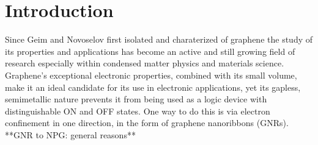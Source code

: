 
\chapter{Introduction}

\label{ch1}


\newcommand{\keyword}[1]{\textbf{#1}}
\newcommand{\tabhead}[1]{\textbf{#1}}
\newcommand{\code}[1]{\texttt{#1}}
\newcommand{\file}[1]{\texttt{\bfseries#1}}
\newcommand{\option}[1]{\texttt{\itshape#1}}


Since Geim and Novoselov first isolated and charaterized of graphene\parencite{Geim2007} the study of its properties and applications has become an active and still growing field of research especially within condensed matter physics and materials science\parencite{Houtsma2021}. Graphene’s exceptional electronic properties, combined with its small volume, make it an ideal candidate for its use in electronic applications, yet its gapless, semimetallic nature prevents it from being used as a logic device with distinguishable ON and OFF states\parencite{Allen2010}. One way to do this is via electron confinement in one direction, in the form of graphene nanoribbons (GNRs).\\


**GNR to NPG: general reasons**\\


